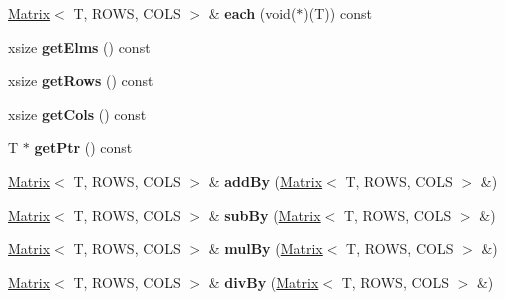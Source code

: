 \begin{DoxyCompactItemize}
\item 
\hypertarget{class_x_1_1_matrix_a6497d0d19cfc10a59379688288c641c4}{\hyperlink{class_x_1_1_matrix}{Matrix}$<$ T, R\-O\-W\-S, C\-O\-L\-S $>$ \& {\bfseries each} (void($\ast$)(T)) const }\label{class_x_1_1_matrix_a6497d0d19cfc10a59379688288c641c4}

\item 
\hypertarget{class_x_1_1_matrix_af9ae720c5001887c594c775ec16c138b}{xsize {\bfseries get\-Elms} () const }\label{class_x_1_1_matrix_af9ae720c5001887c594c775ec16c138b}

\item 
\hypertarget{class_x_1_1_matrix_ac7819d8516e7b389990c6bc4fb9a3bc2}{xsize {\bfseries get\-Rows} () const }\label{class_x_1_1_matrix_ac7819d8516e7b389990c6bc4fb9a3bc2}

\item 
\hypertarget{class_x_1_1_matrix_a30ada40f567ef2c38eb1055553a03c90}{xsize {\bfseries get\-Cols} () const }\label{class_x_1_1_matrix_a30ada40f567ef2c38eb1055553a03c90}

\item 
\hypertarget{class_x_1_1_matrix_aed16c8b920e59640d90fbf17f604c32a}{T $\ast$ {\bfseries get\-Ptr} () const }\label{class_x_1_1_matrix_aed16c8b920e59640d90fbf17f604c32a}

\item 
\hypertarget{class_x_1_1_matrix_a4c1e4ea005aadc3198d4545031c279f6}{\hyperlink{class_x_1_1_matrix}{Matrix}$<$ T, R\-O\-W\-S, C\-O\-L\-S $>$ \& {\bfseries add\-By} (\hyperlink{class_x_1_1_matrix}{Matrix}$<$ T, R\-O\-W\-S, C\-O\-L\-S $>$ \&)}\label{class_x_1_1_matrix_a4c1e4ea005aadc3198d4545031c279f6}

\item 
\hypertarget{class_x_1_1_matrix_a1b012fbcad54bc01d6a40b1aa7dd7dc6}{\hyperlink{class_x_1_1_matrix}{Matrix}$<$ T, R\-O\-W\-S, C\-O\-L\-S $>$ \& {\bfseries sub\-By} (\hyperlink{class_x_1_1_matrix}{Matrix}$<$ T, R\-O\-W\-S, C\-O\-L\-S $>$ \&)}\label{class_x_1_1_matrix_a1b012fbcad54bc01d6a40b1aa7dd7dc6}

\item 
\hypertarget{class_x_1_1_matrix_a4e8a7db49b11b2362149176accff6ae1}{\hyperlink{class_x_1_1_matrix}{Matrix}$<$ T, R\-O\-W\-S, C\-O\-L\-S $>$ \& {\bfseries mul\-By} (\hyperlink{class_x_1_1_matrix}{Matrix}$<$ T, R\-O\-W\-S, C\-O\-L\-S $>$ \&)}\label{class_x_1_1_matrix_a4e8a7db49b11b2362149176accff6ae1}

\item 
\hypertarget{class_x_1_1_matrix_a5f7f50bbcc5724cb38042b9016c468df}{\hyperlink{class_x_1_1_matrix}{Matrix}$<$ T, R\-O\-W\-S, C\-O\-L\-S $>$ \& {\bfseries div\-By} (\hyperlink{class_x_1_1_matrix}{Matrix}$<$ T, R\-O\-W\-S, C\-O\-L\-S $>$ \&)}\label{class_x_1_1_matrix_a5f7f50bbcc5724cb38042b9016c468df}


\end{DoxyCompactItemize}
